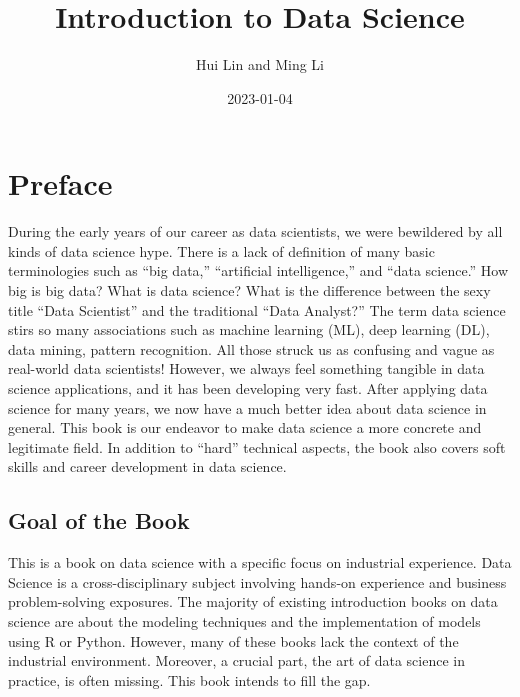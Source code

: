 \documentclass[
  12pt,
]{krantz}
\title{Introduction to Data Science}
\author{Hui Lin and Ming Li}
\date{2023-01-04}
\begin{document}
\maketitle

\thispagestyle{empty}
\begin{center}
\end{center}

\setlength{\abovedisplayskip}{-5pt}
\setlength{\abovedisplayshortskip}{-5pt}

{
\hypersetup{linkcolor=}
\setcounter{tocdepth}{2}
\tableofcontents
}
\listoffigures
\listoftables
\hypertarget{preface}{%
\chapter*{Preface}\label{preface}}


During the early years of our career as data scientists, we were bewildered by all kinds of data science hype. There is a lack of definition of many basic terminologies such as ``big data,'' ``artificial intelligence,'' and ``data science.'' How big is big data? What is data science? What is the difference between the sexy title ``Data Scientist'' and the traditional ``Data Analyst?'' The term data science stirs so many associations such as machine learning (ML), deep learning (DL), data mining, pattern recognition. All those struck us as confusing and vague as real-world data scientists! However, we always feel something tangible in data science applications, and it has been developing very fast. After applying data science for many years, we now have a much better idea about data science in general. This book is our endeavor to make data science a more concrete and legitimate field. In addition to ``hard'' technical aspects, the book also covers soft skills and career development in data science.

\hypertarget{goal-of-the-book}{%
\section*{Goal of the Book}\label{goal-of-the-book}}


This is a book on data science with a specific focus on industrial experience. Data Science is a cross-disciplinary subject involving hands-on experience and business problem-solving exposures. The majority of existing introduction books on data science are about the modeling techniques and the implementation of models using R or Python. However, many of these books lack the context of the industrial environment. Moreover, a crucial part, the art of data science in practice, is often missing. This book intends to fill the gap.
\end{document}
